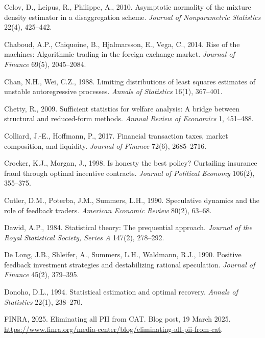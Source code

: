 \documentclass[11pt,letterpaper]{article}
\theoremstyle{definition}
\begin{document}
\begin{list}{}{\footnotesize\linespread{0.89}\selectfont\setlength{\leftmargin}{1.3em}\setlength{\itemindent}{-1.8em}\setlength{\itemsep}{0pt}\setlength{\parsep}{0pt}}
\item Celov, D., Leipus, R., Philippe, A., 2010. Asymptotic normality of the mixture density estimator in a disaggregation scheme. \emph{Journal of Nonparametric Statistics} 22(4), 425--442.

\item Chaboud, A.P., Chiquoine, B., Hjalmarsson, E., Vega, C., 2014. Rise of the machines: Algorithmic trading in the foreign exchange market. \emph{Journal of Finance} 69(5), 2045--2084.

\item Chan, N.H., Wei, C.Z., 1988. Limiting distributions of least squares estimates of unstable autoregressive processes. \emph{Annals of Statistics} 16(1), 367--401.

\item Chetty, R., 2009. Sufficient statistics for welfare analysis: A bridge between structural and reduced-form methods. \emph{Annual Review of Economics} 1, 451--488.

\item Colliard, J.-E., Hoffmann, P., 2017. Financial transaction taxes, market composition, and liquidity. \emph{Journal of Finance} 72(6), 2685--2716.

\item Crocker, K.J., Morgan, J., 1998. Is honesty the best policy? Curtailing insurance fraud through optimal incentive contracts. \emph{Journal of Political Economy} 106(2), 355--375.

\item Cutler, D.M., Poterba, J.M., Summers, L.H., 1990. Speculative dynamics and the role of feedback traders. \emph{American Economic Review} 80(2), 63--68.

\item Dawid, A.P., 1984. Statistical theory: The prequential approach. \emph{Journal of the Royal Statistical Society, Series A} 147(2), 278--292.

\item De Long, J.B., Shleifer, A., Summers, L.H., Waldmann, R.J., 1990. Positive feedback investment strategies and destabilizing rational speculation. \emph{Journal of Finance} 45(2), 379--395.

\item Donoho, D.L., 1994. Statistical estimation and optimal recovery. \emph{Annals of Statistics} 22(1), 238--270.

\item FINRA, 2025. Eliminating all PII from CAT. Blog post, 19 March 2025. \url{https://www.finra.org/media-center/blog/eliminating-all-pii-from-cat}.


\end{list}
\end{document}
